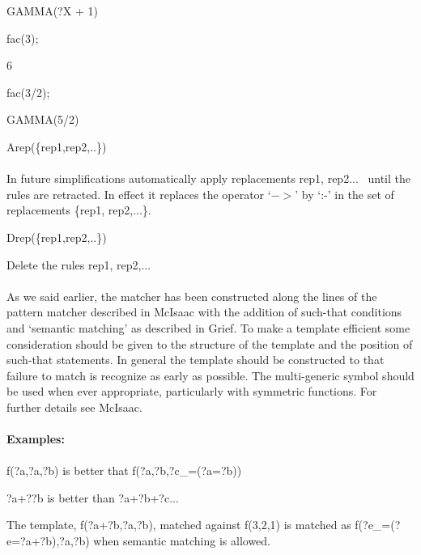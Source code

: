 \documentclass{article}
\begin{document}
 GAMMA(?X + 1)



 fac(3);

 6



 fac(3/2);

 GAMMA(5/2)



Arep(\{rep1,rep2,..\}) \\
\ \\
In future simplifications automatically apply replacements rep1,
rep2...~ until the rules are retracted. In effect it replaces the
operator `$->$' by `:-' in the set of replacements \{rep1, rep2,...\}.



Drep(\{rep1,rep2,..\})



 Delete the rules rep1, rep2,... \\
\ \\
As we said earlier, the matcher has been constructed along the lines of the
pattern matcher described in McIsaac with the addition of such-that
conditions and `semantic matching' as described in Grief. To make a
template efficient some consideration should be given to the structure of
the template and the position of such-that statements. In general the
template should be constructed to that failure to match is recognize as
early as possible. The multi-generic symbol should be used when ever
appropriate, particularly with symmetric functions. For further details
see McIsaac. \\
\ \\
{\bf Examples:} \\
\ \\
 f(?a,?a,?b) is better that f(?a,?b,?c\_=(?a=?b))

 ?a+??b is better than ?a+?b+?c...

The template, f(?a+?b,?a,?b), matched against f(3,2,1) is
matched as f(?e\_=(?e=?a+?b),?a,?b) when semantic matching is allowed. \\
\end{document}
